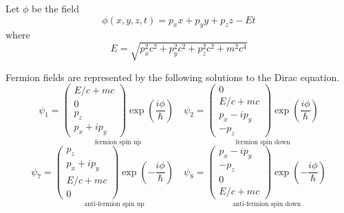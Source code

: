 \documentclass[12pt]{article}
\begin{document}
\noindent
Let $\phi$ be the field
\begin{equation*}
\phi(x,y,z,t)=p_xx+p_yy+p_zz-Et
\end{equation*}
where
\begin{equation*}
E=\sqrt{p_x^2c^2+p_y^2c^2+p_z^2c^2+m^2c^4}
\end{equation*}

\noindent
Fermion fields are represented by
the following solutions to the Dirac equation.
\begin{equation*}
\psi_1=\underset{\text{fermion spin up}}
{
\begin{pmatrix}E/c+mc\\0\\p_z\\p_x+ip_y\end{pmatrix}
\exp\left(\frac{i\phi}{\hbar}\right)
}
\quad
\psi_2=\underset{\text{fermion spin down}}
{
\begin{pmatrix}0\\E/c+mc\\p_x-ip_y\\-p_z\end{pmatrix}
\exp\left(\frac{i\phi}{\hbar}\right)
}
\end{equation*}
\begin{equation*}
\psi_7=\underset{\text{anti-fermion spin up}}
{
\begin{pmatrix}p_z\\p_x+ip_y\\E/c+mc\\0\end{pmatrix}
\exp\left(-\frac{i\phi}{\hbar}\right)
}
\quad
\psi_8=\underset{\text{anti-fermion spin down}}
{
\begin{pmatrix}p_x-ip_y\\-p_z\\0\\E/c+mc\end{pmatrix}
\exp\left(-\frac{i\phi}{\hbar}\right)
}
\end{equation*}
\end{document}
